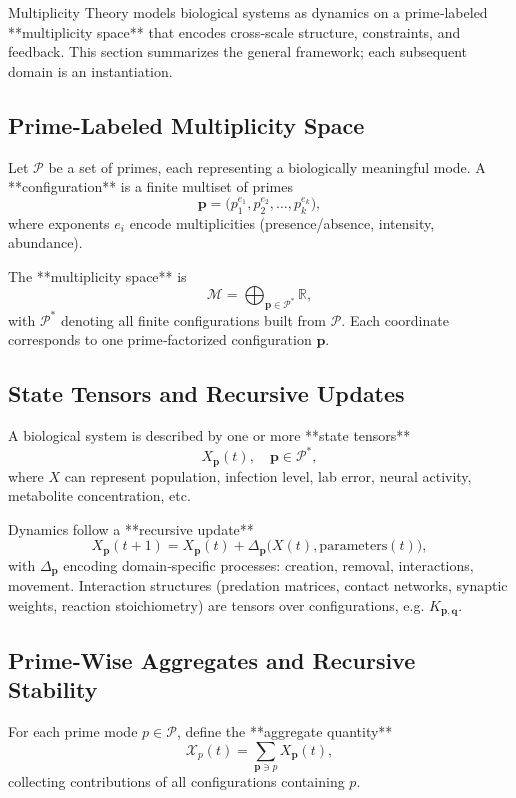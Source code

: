 \documentclass[11pt]{article}
\begin{document}
Multiplicity Theory models biological systems as dynamics on a prime‑labeled **multiplicity space** that encodes cross‑scale structure, constraints, and feedback. This section summarizes the general framework; each subsequent domain is an instantiation.

\subsection{Prime‑Labeled Multiplicity Space}

Let \(\mathcal{P}\) be a set of primes, each representing a biologically meaningful mode. A **configuration** is a finite multiset of primes
\[
\mathbf{p} = \big(p_1^{e_1}, p_2^{e_2}, \dots, p_k^{e_k}\big),
\]
where exponents \(e_i\) encode multiplicities (presence/absence, intensity, abundance).  

The **multiplicity space** is
\[
\mathcal{M} = \bigoplus_{\mathbf{p} \in \mathcal{P}^\ast} \mathbb{R},
\]
with \(\mathcal{P}^\ast\) denoting all finite configurations built from \(\mathcal{P}\). Each coordinate corresponds to one prime‑factorized configuration \(\mathbf{p}\).

\subsection{State Tensors and Recursive Updates}

A biological system is described by one or more **state tensors**
\[
X_{\mathbf{p}}(t), \quad \mathbf{p} \in \mathcal{P}^\ast,
\]
where \(X\) can represent population, infection level, lab error, neural activity, metabolite concentration, etc.

Dynamics follow a **recursive update**
\[
X_{\mathbf{p}}(t+1) = X_{\mathbf{p}}(t) + \Delta_{\mathbf{p}}\big(X(t), \text{parameters}(t)\big),
\]
with \(\Delta_{\mathbf{p}}\) encoding domain‑specific processes: creation, removal, interactions, movement. Interaction structures (predation matrices, contact networks, synaptic weights, reaction stoichiometry) are tensors over configurations, e.g. \(K_{\mathbf{p},\mathbf{q}}\).

\subsection{Prime‑Wise Aggregates and Recursive Stability}

For each prime mode \(p \in \mathcal{P}\), define the **aggregate quantity**
\[
\mathcal{X}_p(t) = \sum_{\mathbf{p} \ni p} X_{\mathbf{p}}(t),
\]
collecting contributions of all configurations containing \(p\). 
\end{document}
